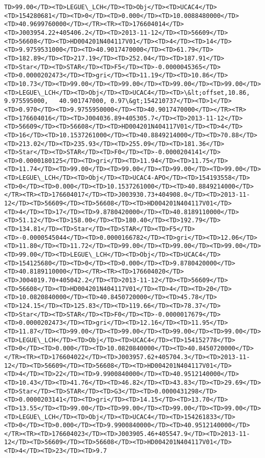 \documentclass[11pt]{article}
\begin{document}
\begin{Verbatim}[commandchars=\\\{\}]
TD>99.00</TD><TD>LEGUE\_LCH</TD><TD>Obj</TD><TD>UCAC4</TD><TD>154280681</TD><TD>0</TD><TD>0.000</TD><TD>10.0088480000</TD><TD>40.9699760000</TD></TR><TR><TD>176604014</TD><TD>J003954.22+405406.2</TD><TD>2013-11-12</TD><TD>56609</TD><TD>56608</TD><TD>HD004201N404117V01</TD><TD>4</TD><TD>14</TD><TD>9.9759531000</TD><TD>40.9017470000</TD><TD>61.79</TD><TD>182.89</TD><TD>217.19</TD><TD>252.04</TD><TD>187.91</TD><TD>Star</TD><TD>STAR</TD><TD>F5</TD><TD>-0.0000045365</TD><TD>0.0000202473</TD><TD>gri</TD><TD>11.19</TD><TD>10.86</TD><TD>10.73</TD><TD>99.00</TD><TD>99.00</TD><TD>99.00</TD><TD>99.00</TD><TD>LEGUE\_LCH</TD><TD>Obj</TD><TD>UCAC4</TD><TD>\&lt;offset,10.86,    9.975595000,   40.901747000, 0.97\&gt;154210737</TD><TD>1</TD><TD>0.970</TD><TD>9.9755950000</TD><TD>40.9017470000</TD></TR><TR><TD>176604016</TD><TD>J004036.89+405305.7</TD><TD>2013-11-12</TD><TD>56609</TD><TD>56608</TD><TD>HD004201N404117V01</TD><TD>4</TD><TD>16</TD><TD>10.1537261000</TD><TD>40.8849214000</TD><TD>70.88</TD><TD>213.02</TD><TD>235.93</TD><TD>255.09</TD><TD>181.36</TD><TD>Star</TD><TD>STAR</TD><TD>F0</TD><TD>-0.0000204141</TD><TD>0.0000180125</TD><TD>gri</TD><TD>11.94</TD><TD>11.75</TD><TD>11.74</TD><TD>99.00</TD><TD>99.00</TD><TD>99.00</TD><TD>99.00</TD><TD>LEGUE\_LCH</TD><TD>Obj</TD><TD>UCAC4-APO</TD><TD>154193558</TD><TD>0</TD><TD>0.000</TD><TD>10.1537261000</TD><TD>40.8849214000</TD></TR><TR><TD>176604017</TD><TD>J003930.73+404908.0</TD><TD>2013-11-12</TD><TD>56609</TD><TD>56608</TD><TD>HD004201N404117V01</TD><TD>4</TD><TD>17</TD><TD>9.8780420000</TD><TD>40.8189110000</TD><TD>51.12</TD><TD>158.00</TD><TD>180.40</TD><TD>192.79</TD><TD>134.81</TD><TD>Star</TD><TD>STAR</TD><TD>F5</TD><TD>-0.0000545044</TD><TD>0.0000166782</TD><TD>gri</TD><TD>12.06</TD><TD>11.80</TD><TD>11.72</TD><TD>99.00</TD><TD>99.00</TD><TD>99.00</TD><TD>99.00</TD><TD>LEGUE\_LCH</TD><TD>Obj</TD><TD>UCAC4</TD><TD>154125680</TD><TD>0</TD><TD>0.000</TD><TD>9.8780420000</TD><TD>40.8189110000</TD></TR><TR><TD>176604020</TD><TD>J004019.70+405042.2</TD><TD>2013-11-12</TD><TD>56609</TD><TD>56608</TD><TD>HD004201N404117V01</TD><TD>4</TD><TD>20</TD><TD>10.0820840000</TD><TD>40.8450720000</TD><TD>45.78</TD><TD>124.15</TD><TD>125.83</TD><TD>119.66</TD><TD>78.37</TD><TD>Star</TD><TD>STAR</TD><TD>F0</TD><TD>-0.0000017679</TD><TD>0.0000202473</TD><TD>gri</TD><TD>12.16</TD><TD>11.95</TD><TD>11.87</TD><TD>99.00</TD><TD>99.00</TD><TD>99.00</TD><TD>99.00</TD><TD>LEGUE\_LCH</TD><TD>Obj</TD><TD>UCAC4</TD><TD>154152778</TD><TD>0</TD><TD>0.000</TD><TD>10.0820840000</TD><TD>40.8450720000</TD></TR><TR><TD>176604022</TD><TD>J003957.62+405704.3</TD><TD>2013-11-12</TD><TD>56609</TD><TD>56608</TD><TD>HD004201N404117V01</TD><TD>4</TD><TD>22</TD><TD>9.9900840000</TD><TD>40.9512140000</TD><TD>10.43</TD><TD>41.76</TD><TD>46.82</TD><TD>43.83</TD><TD>29.69</TD><TD>Star</TD><TD>STAR</TD><TD>G3</TD><TD>0.0000431298</TD><TD>0.0000203141</TD><TD>gri</TD><TD>14.15</TD><TD>13.70</TD><TD>13.55</TD><TD>99.00</TD><TD>99.00</TD><TD>99.00</TD><TD>99.00</TD><TD>LEGUE\_LCH</TD><TD>Obj</TD><TD>UCAC4</TD><TD>154261833</TD><TD>0</TD><TD>0.000</TD><TD>9.9900840000</TD><TD>40.9512140000</TD></TR><TR><TD>176604023</TD><TD>J003905.46+405547.9</TD><TD>2013-11-12</TD><TD>56609</TD><TD>56608</TD><TD>HD004201N404117V01</TD><TD>4</TD><TD>23</TD><TD>9.7
\end{Verbatim}
\end{document}
